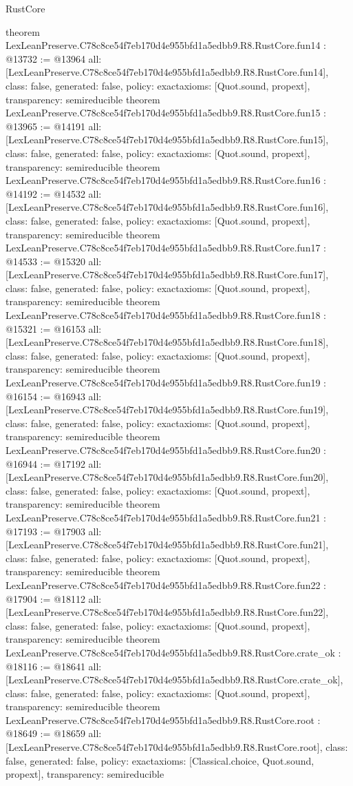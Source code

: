 \begin{lexlean}{RustCore}
\begin{coremodule}
{}
theorem LexLeanPreserve.C78c8ce54f7eb170d4e955bfd1a5edbb9.R8.RustCore.fun14 : @13732 := @13964 {
  all: [LexLeanPreserve.C78c8ce54f7eb170d4e955bfd1a5edbb9.R8.RustCore.fun14],
  class: false,
  generated: false,
  policy: exact{axioms: [Quot.sound, propext]},
  transparency: semireducible
}
theorem LexLeanPreserve.C78c8ce54f7eb170d4e955bfd1a5edbb9.R8.RustCore.fun15 : @13965 := @14191 {
  all: [LexLeanPreserve.C78c8ce54f7eb170d4e955bfd1a5edbb9.R8.RustCore.fun15],
  class: false,
  generated: false,
  policy: exact{axioms: [Quot.sound, propext]},
  transparency: semireducible
}
theorem LexLeanPreserve.C78c8ce54f7eb170d4e955bfd1a5edbb9.R8.RustCore.fun16 : @14192 := @14532 {
  all: [LexLeanPreserve.C78c8ce54f7eb170d4e955bfd1a5edbb9.R8.RustCore.fun16],
  class: false,
  generated: false,
  policy: exact{axioms: [Quot.sound, propext]},
  transparency: semireducible
}
theorem LexLeanPreserve.C78c8ce54f7eb170d4e955bfd1a5edbb9.R8.RustCore.fun17 : @14533 := @15320 {
  all: [LexLeanPreserve.C78c8ce54f7eb170d4e955bfd1a5edbb9.R8.RustCore.fun17],
  class: false,
  generated: false,
  policy: exact{axioms: [Quot.sound, propext]},
  transparency: semireducible
}
theorem LexLeanPreserve.C78c8ce54f7eb170d4e955bfd1a5edbb9.R8.RustCore.fun18 : @15321 := @16153 {
  all: [LexLeanPreserve.C78c8ce54f7eb170d4e955bfd1a5edbb9.R8.RustCore.fun18],
  class: false,
  generated: false,
  policy: exact{axioms: [Quot.sound, propext]},
  transparency: semireducible
}
theorem LexLeanPreserve.C78c8ce54f7eb170d4e955bfd1a5edbb9.R8.RustCore.fun19 : @16154 := @16943 {
  all: [LexLeanPreserve.C78c8ce54f7eb170d4e955bfd1a5edbb9.R8.RustCore.fun19],
  class: false,
  generated: false,
  policy: exact{axioms: [Quot.sound, propext]},
  transparency: semireducible
}
theorem LexLeanPreserve.C78c8ce54f7eb170d4e955bfd1a5edbb9.R8.RustCore.fun20 : @16944 := @17192 {
  all: [LexLeanPreserve.C78c8ce54f7eb170d4e955bfd1a5edbb9.R8.RustCore.fun20],
  class: false,
  generated: false,
  policy: exact{axioms: [Quot.sound, propext]},
  transparency: semireducible
}
theorem LexLeanPreserve.C78c8ce54f7eb170d4e955bfd1a5edbb9.R8.RustCore.fun21 : @17193 := @17903 {
  all: [LexLeanPreserve.C78c8ce54f7eb170d4e955bfd1a5edbb9.R8.RustCore.fun21],
  class: false,
  generated: false,
  policy: exact{axioms: [Quot.sound, propext]},
  transparency: semireducible
}
theorem LexLeanPreserve.C78c8ce54f7eb170d4e955bfd1a5edbb9.R8.RustCore.fun22 : @17904 := @18112 {
  all: [LexLeanPreserve.C78c8ce54f7eb170d4e955bfd1a5edbb9.R8.RustCore.fun22],
  class: false,
  generated: false,
  policy: exact{axioms: [Quot.sound, propext]},
  transparency: semireducible
}
theorem LexLeanPreserve.C78c8ce54f7eb170d4e955bfd1a5edbb9.R8.RustCore.crate_ok : @18116 := @18641 {
  all: [LexLeanPreserve.C78c8ce54f7eb170d4e955bfd1a5edbb9.R8.RustCore.crate_ok],
  class: false,
  generated: false,
  policy: exact{axioms: [Quot.sound, propext]},
  transparency: semireducible
}
theorem LexLeanPreserve.C78c8ce54f7eb170d4e955bfd1a5edbb9.R8.RustCore.root : @18649 := @18659 {
  all: [LexLeanPreserve.C78c8ce54f7eb170d4e955bfd1a5edbb9.R8.RustCore.root],
  class: false,
  generated: false,
  policy: exact{axioms: [Classical.choice, Quot.sound, propext]},
  transparency: semireducible
}


\end{coremodule}
\end{lexlean}
